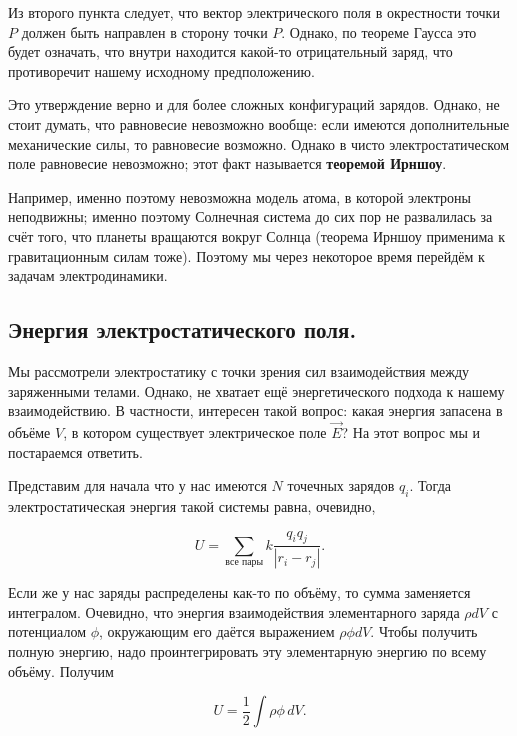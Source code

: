 \documentclass[11pt,a4paper]{article}
\numberwithin{equation}{section}
\begin{document}
Из второго пункта следует, что вектор электрического поля в 
окрестности точки $P$ должен быть направлен в сторону точки
$P$. Однако, по теореме Гаусса это будет означать, что внутри
находится какой-то отрицательный заряд, что противоречит нашему
исходному предположению. 

Это утверждение верно и для более сложных конфигураций
зарядов. Однако, не стоит думать, что равновесие невозможно вообще:
если имеются дополнительные механические силы, то равновесие
возможно. Однако в чисто электростатическом поле равновесие
невозможно; этот факт называется \textbf{теоремой Ирншоу}. 

Например, именно поэтому невозможна модель атома, в которой электроны
неподвижны; именно поэтому Солнечная система до сих пор не развалилась
за счёт того, что планеты вращаются вокруг Солнца (теорема Ирншоу
применима к гравитационным силам тоже). Поэтому мы через некоторое
время перейдём к задачам электродинамики. 

\subsection{Энергия электростатического поля.}
\label{sec:statics_energy}

Мы рассмотрели электростатику с точки зрения сил взаимодействия между
заряженными телами. Однако, не хватает ещё энергетического подхода к
нашему взаимодействию. В частности, интересен такой вопрос: какая
энергия запасена в объёме $V$, в котором существует электрическое поле
$\vec{E}$? На этот вопрос мы и постараемся ответить.

Представим для начала что у нас имеются $N$ точечных зарядов
$q_i$. Тогда электростатическая энергия такой системы равна, очевидно, 

\begin{equation}
  \label{eq:energy_pointlike}
  U = \sum_{\text{все пары}} k \frac{q_i q_j}{|r_i - r_j|}.
\end{equation}

Если же у нас заряды распределены как-то по объёму, то сумма
заменяется интегралом. Очевидно, что энергия взаимодействия
элементарного заряда $\rho dV$ с потенциалом $\phi$, окружающим его
даётся выражением $\rho \phi dV$. Чтобы получить полную энергию,
надо проинтегрировать эту элементарную энергию по всему
объёму. Получим

\begin{equation}
  \label{eq:energy_volume}
  U = \frac12 \int \rho \phi\, dV.
\end{equation}
\end{document}
